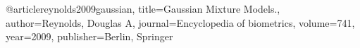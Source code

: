 @article{reynolds2009gaussian,
  title={Gaussian Mixture Models.},
  author={Reynolds, Douglas A},
  journal={Encyclopedia of biometrics},
  volume={741},
  year={2009},
  publisher={Berlin, Springer}
}